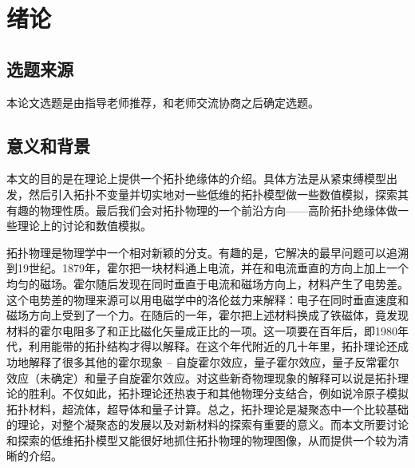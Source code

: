 \chapter{绪论}
\section{选题来源}
本论文选题是由指导老师推荐，和老师交流协商之后确定选题。
\section{意义和背景}
本文的目的是在理论上提供一个拓扑绝缘体的介绍。具体方法是从紧束缚模型出发，然后引入拓扑不变量并切实地对一些低维的拓扑模型做一些数值模拟，探索其有趣的物理性质。最后我们会对拓扑物理的一个前沿方向——高阶拓扑绝缘体做一些理论上的讨论和数值模拟。

拓扑物理是物理学中一个相对新颖的分支。有趣的是，它解决的最早问题可以追溯到19世纪。1879年，霍尔把一块材料通上电流，并在和电流垂直的方向上加上一个均匀的磁场。霍尔随后发现在同时垂直于电流和磁场方向上，材料产生了电势差\cite{hallOrigin}。这个电势差的物理来源可以用电磁学中的洛伦兹力来解释：电子在同时垂直速度和磁场方向上受到了一个力。在随后的一年，霍尔把上述材料换成了铁磁体，竟发现材料的霍尔电阻多了和正比磁化矢量成正比的一项\cite{hall2nd}。这一项要在百年后，即1980年代，利用能带的拓扑结构才得以解释。在这个年代附近的几十年里，拓扑理论还成功地解释了很多其他的霍尔现象 – 自旋霍尔效应，量子霍尔效应，量子反常霍尔效应（未确定）和量子自旋霍尔效应。对这些新奇物理现象的解释可以说是拓扑理论的胜利。不仅如此，拓扑理论还热衷于和其他物理分支结合，例如说冷原子模拟拓扑材料，超流体，超导体和量子计算。总之，拓扑理论是凝聚态中一个比较基础的理论，对整个凝聚态的发展以及对新材料的探索有重要的意义。而本文所要讨论和探索的低维拓扑模型又能很好地抓住拓扑物理的物理图像，从而提供一个较为清晰的介绍。

